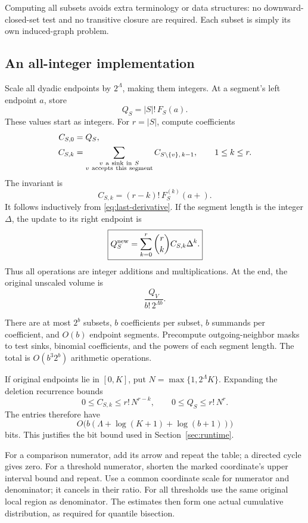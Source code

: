 Computing all subsets avoids extra terminology or data structures: no downward-closed-set test and no transitive closure are required. Each subset is simply its own induced-graph problem.

\subsection{An all-integer implementation}

Scale all dyadic endpoints by \(2^\Lambda\), making them integers. At a segment's left endpoint \(a\), store
\[
Q_S=|S|!\,F_S(a).
\]
These values start as integers. For \(r=|S|\), compute coefficients
\begin{align}
C_{S,0}&=Q_S,\nonumber\\
C_{S,k}
&=\sum_{\substack{v\ {\rm a\ sink\ in}\ S\\
                 v\ {\rm accepts\ this\ segment}}}
 C_{S\setminus\{v\},\,k-1},
\qquad 1\le k\le r.\label{eq:coeff}
\end{align}
The invariant is
\[
C_{S,k}=(r-k)!\,F_S^{(k)}(a+).
\]
It follows inductively from \eqref{eq:last-derivative}. If the segment length is the integer \(\Delta\), the update to its right endpoint is
\begin{equation}\label{eq:integer-table}
\boxed{
Q_S^{\rm new}
=\sum_{k=0}^r\binom rk C_{S,k}\Delta^k.
}
\end{equation}
Thus all operations are integer additions and multiplications. At the end, the original unscaled volume is
\[
\frac{Q_V}{b!\,2^{\Lambda b}}.
\]

There are at most \(2^b\) subsets, \(b\) coefficients per subset, \(b\) summands per coefficient, and \(O(b)\) endpoint segments. Precompute outgoing-neighbor masks to test sinks, binomial coefficients, and the powers of each segment length. The total is \(O(b^3 2^b)\) arithmetic operations.

If original endpoints lie in \([0,K]\), put \(N=\max\{1,2^\Lambda K\}\). Expanding the deletion recurrence bounds
\[
0\le C_{S,k}\le r!\,N^{r-k},\qquad
0\le Q_S\le r!\,N^r.
\]
The entries therefore have
\[
O\bigl(b(\Lambda+\log(K+1)+\log(b+1))\bigr)
\]
bits. This justifies the bit bound used in Section~\ref{sec:runtime}.

For a comparison numerator, add its arrow and repeat the table; a directed cycle gives zero. For a threshold numerator, shorten the marked coordinate's upper interval bound and repeat. Use a common coordinate scale for numerator and denominator; it cancels in their ratio. For all thresholds use the same original local region as denominator. The estimates then form one actual cumulative distribution, as required for quantile bisection.

